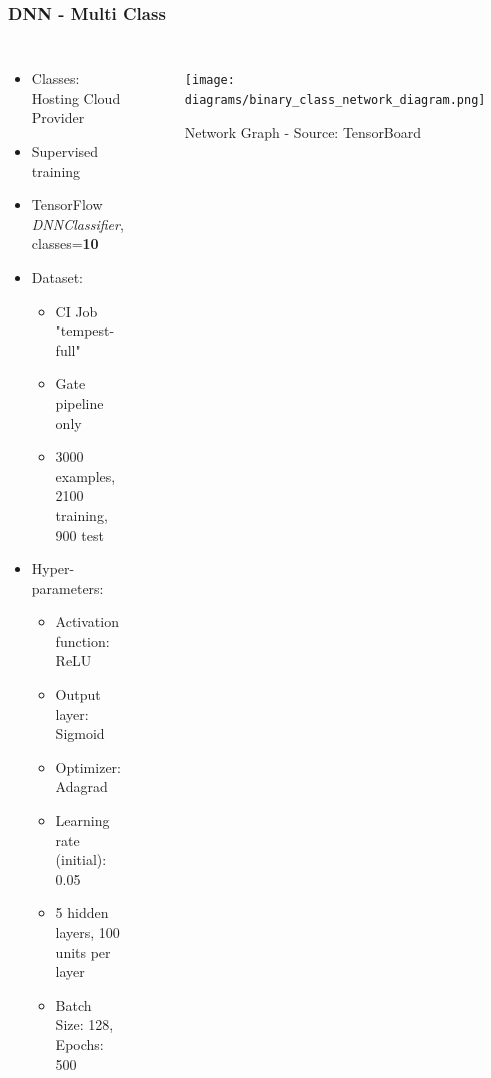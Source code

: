 \documentclass[aspectratio=169,11pt,hyperref={colorlinks=true}]{beamer}
\begin{document}
\begin{frame}
    \frametitle{DNN - Multi Class}
    \begin{columns}
        \begin{itemize}
            \item{Classes: Hosting Cloud Provider}
            \item{Supervised training}
            \item{TensorFlow \emph{DNNClassifier}, classes=\textbf{10}}
            \item{Dataset:}
            \begin{itemize}
              \item{CI Job "tempest-full"}
              \item{Gate pipeline only}
              \item{3000 examples, 2100 training, 900 test}
            \end{itemize}
            \item{Hyper-parameters:}
            \begin{itemize}
              \item{Activation function: ReLU}
              \item{Output layer: Sigmoid}
              \item{Optimizer: Adagrad}
              \item{Learning rate (initial): 0.05}
              \item{5 hidden layers, 100 units per layer}
              \item{Batch Size: 128, Epochs: 500}
            \end{itemize}
        \end{itemize}
        \begin{figure}
        \begin{center}
          \texttt{[image: diagrams/binary\_class\_network\_diagram.png]}
             \caption{Network Graph - Source: TensorBoard}
        \end{center}
        \end{figure}
    \end{columns}
\end{frame}
\end{document}

